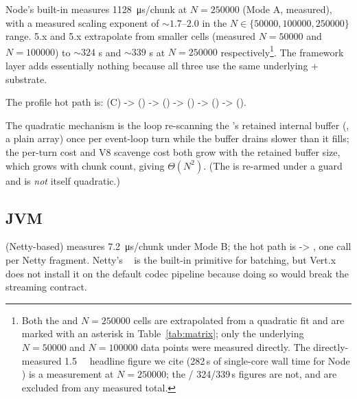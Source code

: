 Node's built-in  measures
\SI{1128}{\micro\second}/chunk at $N{=}\num{250000}$ (Mode A,
measured), with a measured scaling exponent of $\sim 1.7$--$2.0$
in the $N \in \{\num{50000}, \num{100000}, \num{250000}\}$ range.
 5.x and  5.x extrapolate from
smaller cells (measured $N{=}\num{50000}$ and $N{=}\num{100000}$)
to $\sim 324$ s and $\sim 339$ s at $N{=}\num{250000}$
respectively\footnote{Both the  and 
$N{=}\num{250000}$ cells are extrapolated from a quadratic fit and
are marked with an asterisk in Table~\ref{tab:matrix}; only the
underlying $N{=}\num{50000}$ and $N{=}\num{100000}$ data points
were measured directly. The directly-measured \SI{1.5}{\mebi\byte}
headline figure we cite (282\,s of single-core wall time for Node
) is a measurement at $N{=}\num{250000}$; the
/ 324/339\,s figures are not, and are
excluded from any measured total.}. The
framework layer adds essentially nothing because all three use
the same underlying  + 
substrate.

The profile hot path is:
 (C) -> 
() ->
() ->
 () ->
() ->
().

The quadratic mechanism is the 
 loop re-scanning the 's retained
internal buffer (, a plain array)
once per event-loop turn while the buffer drains slower than it
fills; the per-turn cost and V8 scavenge cost both grow with the
retained buffer size, which grows with chunk count, giving
$\Theta(N^2)$. (The   is
re-armed under a  guard and is \emph{not}
itself quadratic.)

\subsection{JVM}
\label{sec:pf-jvm}

 (Netty-based) measures \SI{7.2}{\micro\second}/chunk
under Mode B; the hot path is
 ->
, one
 call per Netty  fragment.
Netty's ~\cite{netty_aggregator} is
the built-in primitive for batching, but Vert.x does not install it
on the default codec pipeline because doing so would break the
streaming  contract.

